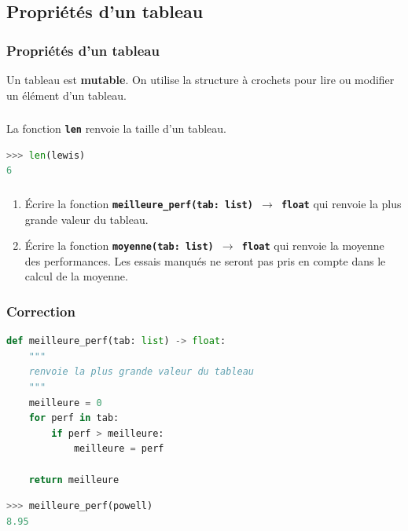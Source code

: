 \documentclass[svgnames,11pt]{beamer}
\begin{document}
\subsection{Propriétés d'un tableau}
\begin{frame}
    \frametitle{Propriétés d'un tableau}

    \begin{aretenir}[]
        Un tableau est \textbf{mutable}. On utilise la structure à crochets pour lire ou modifier un élément d'un tableau.
    \end{aretenir}

\end{frame}
\begin{frame}[fragile]
    \frametitle{}

    \begin{aretenir}[]
        La fonction \textbf{\texttt{len}} renvoie la taille d'un tableau.
    \end{aretenir}


    \begin{lstlisting}[language=Python , basicstyle=\ttfamily\small, xleftmargin=2em, xrightmargin=2em]
>>> len(lewis)
6
\end{lstlisting}
\end{frame}
\begin{frame}
    \frametitle{}

    \begin{activite}
        \begin{enumerate}
            \item Écrire la fonction \textbf{\texttt{meilleure\_perf(tab: list) $\rightarrow$ float}} qui renvoie la plus grande valeur du tableau.
            \item Écrire la fonction \textbf{\texttt{moyenne(tab: list) $\rightarrow$ float}} qui renvoie la moyenne des performances. Les essais manqués ne seront pas pris en compte dans le calcul de la moyenne.
        \end{enumerate}
    \end{activite}

\end{frame}
\begin{frame}[fragile]
    \frametitle{Correction}

    \begin{lstlisting}[language=Python , basicstyle=\ttfamily\small, xleftmargin=2em, xrightmargin=2em]
def meilleure_perf(tab: list) -> float:
    """
    renvoie la plus grande valeur du tableau
    """
    meilleure = 0
    for perf in tab:
        if perf > meilleure:
            meilleure = perf

    return meilleure
\end{lstlisting}
    \begin{center}
        \begin{lstlisting}[language=Python , basicstyle=\ttfamily\small, xleftmargin=2em, xrightmargin=2em]
>>> meilleure_perf(powell)
8.95
\end{lstlisting}
        \label{CODE}
    \end{center}
\end{frame}
\end{document}

